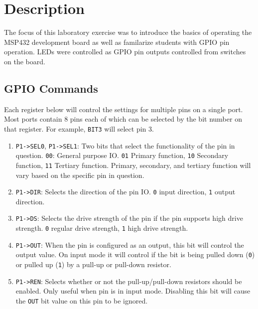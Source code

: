 \documentclass[CMPE]{../KGCOEReport}
\def\code#1{\texttt{#1}}
\begin{document}
    \maketitle
    \section*{Description}

    The focus of this laboratory exercise was to introduce the basics of operating the
    MSP432 development board as well as familarize students with GPIO pin operation.
    LEDs were controlled as GPIO pin outputs controlled from switches on the board.

	\subsection*{GPIO Commands}

	Each register below will control the settings for multiple pins on a single port.
	Most ports contain 8 pins each of which can be selected by the bit number on that register. For example, \code{BIT3} will select pin 3.

	\begin{enumerate}
  \item{\code{P1->SEL0}, \code{P1->SEL1}:}
  Two bits that select the functionality of the pin in question. \code{00}: General purpose IO. \code{01} Primary function, \code{10} Secondary function, \code{11} Tertiary function. Primary, secondary, and tertiary function will vary based on the specific pin in question.
  \item{\code{P1->DIR}:}
  Selects the direction of the pin IO. \code{0} input direction, \code{1} output direction.
  \item{\code{P1->DS}:}
  Selects the drive strength of the pin if the pin supports high drive strength. \code{0} regular drive strength, \code{1} high drive strength.
  \item{\code{P1->OUT}:}
  When the pin is configured as an output, this bit will control the output value. On input mode it will control if the bit is being pulled down (\code{0}) or pulled up (\code{1}) by a pull-up or pull-down resistor.
  \item{\code{P1->REN}:}
  Selects whether or not the pull-up/pull-down resistors should be enabled. Only useful when pin is in input mode. Disabling this bit will cause the \code{OUT} bit value on this pin to be ignored.
\end{enumerate}


\end{document}
